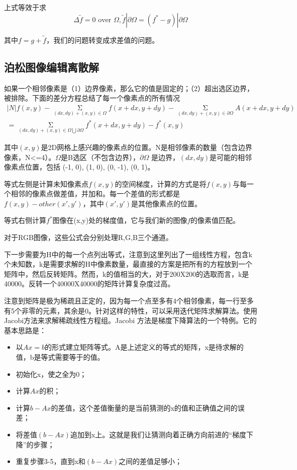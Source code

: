 上式等效于求
\begin{equation}
\Delta \tilde{f} = 0\text{ over }\Omega,\tilde{f}|\partial{\Omega} = (f^* - g)|\partial{\Omega}
\label{poi_equ}
\end{equation}

其中\(f = g + \tilde{f}\)，我们的问题转变成求差值的问题。

\subsection{泊松图像编辑离散解}
如果一个相邻像素是（1）边界像素，那么它的值是固定的；（2）超出选区边界，被排除。下面的差分方程总结了每一个像素点的所有情况
\begin{equation}
\begin{aligned}
|N|f(x,y) - \mathop {\Sigma }\limits_{(dx,dy)+(x,y) \in{\Omega}}f(x+dx,y+dy)
-\mathop {\Sigma }\limits_{(dx,dy)+(x,y) \in{\partial{\Omega}}}A(x+dx,y+dy) \\
= \mathop {\Sigma }\limits_{(dx,dy)+(x,y) \in{\Omega \bigcup {\partial{\Omega}}}}
f^*(x+dx,y+dy) - f^*(x,y)
\end{aligned}
\end{equation}

其中\((x,y)\)是2D网格上感兴趣的像素点的位置。N是相邻像素的数量（包含边界像素，N<=4）。\(\Omega\)是B选区（不包含边界），\(\partial \Omega\) 是边界，\((dx, dy)\)是可能的相邻像素点位置，包括 {(-1, 0), (1, 0), (0, -1), (0, 1)}。

等式左侧是计算未知像素点\(f(x, y)\)的空间梯度，计算的方式是将\(f(x,y)\)与每一个相邻的像素点做差值，并加和。每一个差值的形式都是\(f(x,y) - other(x',y')\)，其中\((x',y')\)是其他像素点的位置。

等式右侧计算\(f^*\)图像在(x,y)处的梯度值，它与我们新的图像\(f\)的像素值匹配。

对于RGB图像，这些公式会分别处理R,G,B三个通道。

下一步需要为H中的每一个点列出等式，注意到这里列出了一组线性方程，包含k个未知数，k是需要求解的H中像素数量，最直接的方案是把所有的方程放到一个矩阵中，然后反转矩阵。然而，k的值相当的大，对于200X200的选取而言，k是40000。反转一个40000X40000的矩阵计算复杂度过高。

注意到矩阵是极为稀疏且正定的，因为每一个点至多有4个相邻像素，每一行至多有5个非零的元素，其余是0。针对这样的特性，可以采用迭代矩阵求解算法。使用Jacobi方法来求解稀疏线性方程组。Jacobi 方法是梯度下降算法的一个特例。它的基本思路是：

\begin{itemize}
\item 以\(A x = b\)的形式建立矩阵等式。A是上述定义的等式的矩阵，x是待求解的值，b是等式需要等于的值。
\item 初始化x，使之全为0；
\item 计算\(Ax\)的积；
\item 计算\(b-Ax\)的差值，这个差值衡量的是当前猜测的x的值和正确值之间的误差；
\item 将差值\((b-Ax)\)追加到x上。这就是我们让猜测向着正确方向前进的“梯度下降”的步骤；
\item 重复步骤3-5，直到x和\((b-Ax)\)之间的差值足够小；
\end{itemize}

